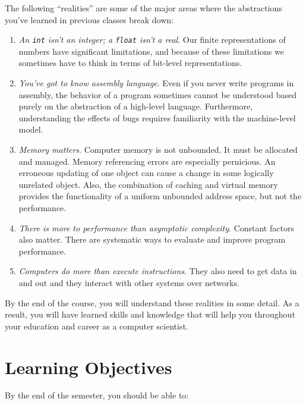\documentclass{article}
\begin{document}
The following ``realities'' are some of the major areas where the abstractions you've
learned in previous classes break down:
\begin{enumerate}
\item \emph{An \texttt{int} isn't an integer; a \texttt{float} isn't a real}.
Our finite representations of numbers have significant limitations,
and because of these limitations
we sometimes have to think in terms of bit-level representations.
\item \emph{You've got to know assembly language}.
Even if you never write programs in assembly,
the behavior of a program sometimes cannot be understood
based purely on the abstraction of a high-level language.
Furthermore, understanding the effects of bugs
requires familiarity with the machine-level model.
\item \emph{Memory matters}.
Computer memory is not unbounded.
It must be allocated and managed.
Memory referencing errors are especially pernicious.
An erroneous updating of one object can cause a change
in some logically unrelated object.
Also, the combination of caching and virtual memory
provides the functionality of a uniform unbounded address space,
but not the performance.
\item \emph{There is more to performance than asymptotic complexity}.
Constant factors also matter.
There are systematic ways to evaluate and improve program performance.
\item \emph{Computers do more than execute instructions}.
They also need to get data in and out
and they interact with other systems over networks.
\end{enumerate}

By the end of the course, you will understand these realities in some detail.
As a result, you will have learned skills and knowledge
that will help you throughout your education and career as a computer scientist.

\section{Learning Objectives}
\label{sec:orgheadline4}

By the end of the semester, you should be able to:
\end{document}
